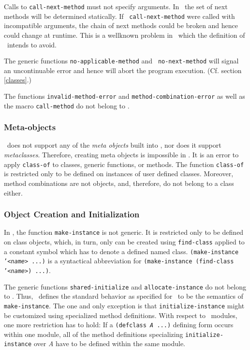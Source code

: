 Calls to {\tt call-next-method} must not specify arguments. In \ the 
set of next methods will be determined statically. If {\tt 
call-next-method} were called with incompatible arguments, the chain of 
next methods could be broken and hence could change at runtime. This is a 
wellknown problem in \CLOS\ which the definition of \ intends to 
avoid.

The generic functions {\tt no-applicable-method} and {\tt 
no-next-method} will signal an uncontinuable error and hence will abort the 
program execution. (Cf. section \ref{classes}.)

The functions {\tt invalid-method-error} and {\tt method-combination-error} 
as well as the macro {\tt call-method} do not belong to .

\subsubsection{Meta-objects}
\label{metaobjects}

\ does not support any of the {\em meta objects} built into \CLOS, 
nor does it support {\em metaclasses}. Therefore, creating meta objects is 
impossible in . It is an error to apply {\tt class-of} to classes, generic 
functions, or methods. The function {\tt class-of} is restricted only to be 
defined on instances of user defined classes. Moreover, method 
combinations are not objects, and, therefore, do not belong to a class 
either. 

\subsubsection{Object Creation and Initialization}
\label{objects}

In , the function {\tt make-instance} is not generic. It is restricted 
only to be defined on class objects, which, in turn, only can be created 
using {\tt find-class} applied to a constant symbol which has to denote a defined 
named class. {\tt (make-instance '<{\it name}\/> ...)} is a syntactical 
abbreviation for {\tt (make-instance (find-class '<{\it name}\/>) ...)}.

The generic functions {\tt shared-initialize} and {\tt allocate-instance} 
do not belong to . Thus, \ defines the standard behavior as 
specified for \CLOS\ to be the semantics of {\tt make-instance}. The one 
and only exception is that {\tt initialize-instance} might be customized 
using specialized method definitions. With respect to \ modules, one 
more restriction has to hold: If a {\tt (defclass {\it A} ...)} defining 
form occurs within one module, all of the method definitions specializing 
{\tt initialize-instance} over {\it A}\/ have to be defined within the same 
module.

